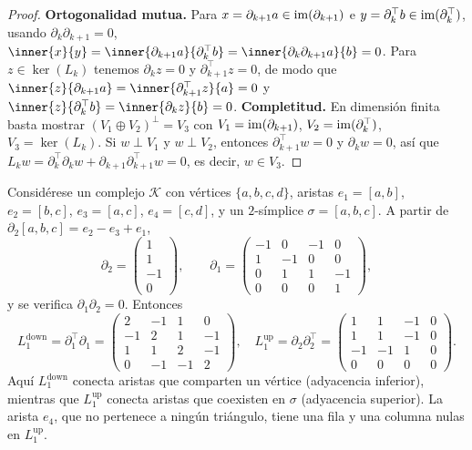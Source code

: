 \begin{proof}
\textbf{Ortogonalidad mutua.} Para $x = \partial_{k+1} a \in \operatorname{im}(\partial_{k+1})$
e $y = \partial_k^\top b \in \operatorname{im}(\partial_k^\top)$, usando
$\partial_k \partial_{k+1} = 0$,
$\inner{x}{y} = \inner{\partial_{k+1} a}{\partial_k^\top b}
= \inner{\partial_k \partial_{k+1} a}{b} = 0$. Para $z \in \ker(L_k)$ tenemos
$\partial_k z = 0$ y $\partial_{k+1}^\top z = 0$, de modo que
$\inner{z}{\partial_{k+1} a} = \inner{\partial_{k+1}^\top z}{a} = 0$ y
$\inner{z}{\partial_k^\top b} = \inner{\partial_k z}{b} = 0$.
\textbf{Completitud.} En dimensi\'on finita basta mostrar
$(V_1 \oplus V_2)^\perp = V_3$ con $V_1 = \operatorname{im}(\partial_{k+1})$,
$V_2 = \operatorname{im}(\partial_k^\top)$, $V_3 = \ker(L_k)$. Si
$w \perp V_1$ y $w \perp V_2$, entonces $\partial_{k+1}^\top w = 0$ y
$\partial_k w = 0$, as\'i que
$L_k w = \partial_k^\top \partial_k w + \partial_{k+1}\partial_{k+1}^\top w = 0$,
es decir, $w \in V_3$.
\end{proof}

\begin{example}
\label{ex:graphs:hodge-L1}
Consid\'erese un complejo $\mathcal{K}$ con v\'ertices $\{a, b, c, d\}$, aristas
$e_1 = [a,b]$, $e_2 = [b,c]$, $e_3 = [a,c]$, $e_4 = [c,d]$, y un $2$-s\'implice
$\sigma = [a,b,c]$. A partir de $\partial_2[a,b,c] = e_2 - e_3 + e_1$,
\[
  \partial_2 = \begin{pmatrix} 1 \\ 1 \\ -1 \\ 0 \end{pmatrix}, \qquad
  \partial_1 = \begin{pmatrix}
    -1 & 0 & -1 & 0 \\ 1 & -1 & 0 & 0 \\ 0 & 1 & 1 & -1 \\ 0 & 0 & 0 & 1
  \end{pmatrix},
\]
y se verifica $\partial_1 \partial_2 = 0$. Entonces
\[
  L_1^{\mathrm{down}} = \partial_1^\top \partial_1 = \begin{pmatrix}
    2 & -1 & 1 & 0 \\ -1 & 2 & 1 & -1 \\ 1 & 1 & 2 & -1 \\ 0 & -1 & -1 & 2
  \end{pmatrix}, \quad
  L_1^{\mathrm{up}} = \partial_2 \partial_2^\top = \begin{pmatrix}
    1 & 1 & -1 & 0 \\ 1 & 1 & -1 & 0 \\ -1 & -1 & 1 & 0 \\ 0 & 0 & 0 & 0
  \end{pmatrix}.
\]
Aqu\'i $L_1^{\mathrm{down}}$ conecta aristas que comparten un v\'ertice
(adyacencia inferior), mientras que $L_1^{\mathrm{up}}$ conecta aristas que
coexisten en $\sigma$ (adyacencia superior). La arista $e_4$, que no pertenece a
ning\'un tri\'angulo, tiene una fila y una columna nulas en $L_1^{\mathrm{up}}$.
\end{example}


